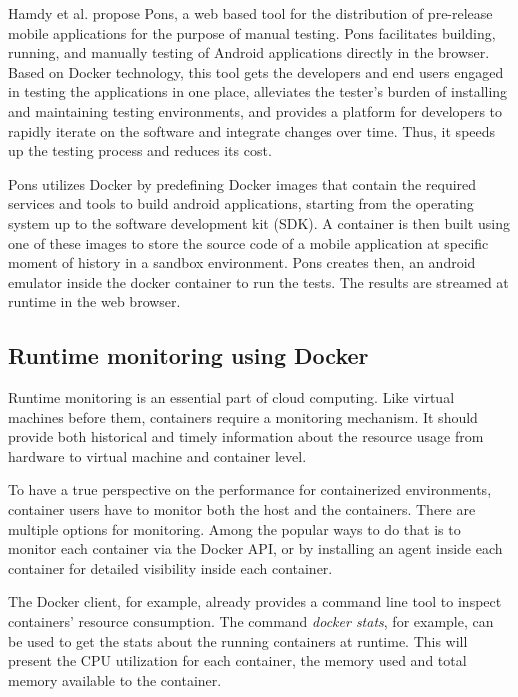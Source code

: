 Hamdy et al.\cite{hamdy2016web} propose Pons, a web based tool for the distribution of pre-release mobile
applications for the purpose of manual testing. Pons facilitates building, running, and manually testing of Android applications directly in the browser. 
Based on Docker technology, this tool gets the developers and end users engaged in testing the applications in one
place, alleviates the tester's burden of installing and maintaining testing environments, and provides a platform for developers to rapidly iterate on the software and integrate changes over time. Thus, it speeds up the testing process and reduces its cost.

Pons utilizes Docker by predefining Docker images that
contain the required services and tools to build android
applications, starting from the operating system up to the
software development kit (SDK). A container is then built using one of these images to store the source code of
a mobile application at specific moment of history in a
sandbox environment. Pons creates then, an android emulator inside the docker container to run the tests. The results are streamed at runtime in the web browser.

\subsection{Runtime monitoring using Docker} 

 

Runtime monitoring is an essential part of cloud computing\cite{aceto2013cloud}. Like virtual machines before them, containers require a monitoring mechanism. It should provide both historical and timely information about the resource usage from hardware to virtual machine and container level.


To have a true perspective on the performance for containerized environments, container users have to monitor both the host and the containers. There are multiple options for monitoring. 
Among the popular ways to do that is to monitor each container via the Docker API, or by installing an agent inside each container for detailed visibility inside each container. 

The Docker client, for example, already provides a command line tool to inspect containers’ resource consumption. The command \textit{docker stats}, for example, can be used to get the stats about the running containers at runtime. This will present the CPU utilization for each container, the memory used and total memory available to the container.

